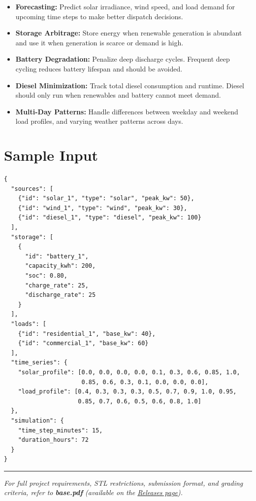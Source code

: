 \begin{itemize}
  \item \textbf{Forecasting:} Predict solar irradiance, wind speed, and load demand for upcoming time steps to make better dispatch decisions.
  \item \textbf{Storage Arbitrage:} Store energy when renewable generation is abundant and use it when generation is scarce or demand is high.
  \item \textbf{Battery Degradation:} Penalize deep discharge cycles. Frequent deep cycling reduces battery lifespan and should be avoided.
  \item \textbf{Diesel Minimization:} Track total diesel consumption and runtime. Diesel should only run when renewables and battery cannot meet demand.
  \item \textbf{Multi-Day Patterns:} Handle differences between weekday and weekend load profiles, and varying weather patterns across days.
\end{itemize}

\section{Sample Input}

\begin{lstlisting}[style=json]
{
  "sources": [
    {"id": "solar_1", "type": "solar", "peak_kw": 50},
    {"id": "wind_1", "type": "wind", "peak_kw": 30},
    {"id": "diesel_1", "type": "diesel", "peak_kw": 100}
  ],
  "storage": [
    {
      "id": "battery_1",
      "capacity_kwh": 200,
      "soc": 0.80,
      "charge_rate": 25,
      "discharge_rate": 25
    }
  ],
  "loads": [
    {"id": "residential_1", "base_kw": 40},
    {"id": "commercial_1", "base_kw": 60}
  ],
  "time_series": {
    "solar_profile": [0.0, 0.0, 0.0, 0.0, 0.1, 0.3, 0.6, 0.85, 1.0,
                      0.85, 0.6, 0.3, 0.1, 0.0, 0.0, 0.0],
    "load_profile": [0.4, 0.3, 0.3, 0.3, 0.5, 0.7, 0.9, 1.0, 0.95,
                     0.85, 0.7, 0.6, 0.5, 0.6, 0.8, 1.0]
  },
  "simulation": {
    "time_step_minutes": 15,
    "duration_hours": 72
  }
}
\end{lstlisting}

\vfill
\noindent\rule{\textwidth}{0.4pt}
{\small\textit{For full project requirements, STL restrictions, submission format, and grading criteria, refer to \textbf{base.pdf} (available on the \href{https://github.com/BestSithInEU/cse211-term-projects/releases}{Releases page}).}}
